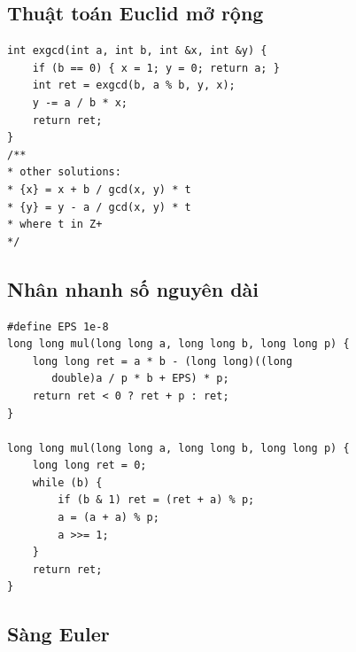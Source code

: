 \documentclass[11pt]{article}
\begin{document}
\subsection{Thuật toán Euclid mở rộng}

\begingroup
\footnotesize
\begin{verbatim}
int exgcd(int a, int b, int &x, int &y) {
    if (b == 0) { x = 1; y = 0; return a; }
    int ret = exgcd(b, a % b, y, x);
    y -= a / b * x;
    return ret;
}
/**
* other solutions:
* {x} = x + b / gcd(x, y) * t
* {y} = y - a / gcd(x, y) * t
* where t in Z+
*/
\end{verbatim}
\endgroup

\subsection{Nhân nhanh số nguyên dài}

\begingroup
\footnotesize
\begin{verbatim}
#define EPS 1e-8
long long mul(long long a, long long b, long long p) {
    long long ret = a * b - (long long)((long
       double)a / p * b + EPS) * p;
    return ret < 0 ? ret + p : ret;
}

long long mul(long long a, long long b, long long p) {
    long long ret = 0;
    while (b) {
        if (b & 1) ret = (ret + a) % p;
        a = (a + a) % p;
        a >>= 1;
    }
    return ret;
}
\end{verbatim}
\endgroup

\subsection{Sàng Euler}
\end{document}
